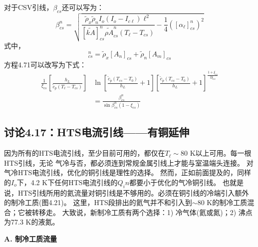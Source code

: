 对于CSV引线，$\beta_{cs}$还可以写为：
\begin{equation}%
\beta_{cs}^{n}=\sqrt{\frac{\tilde{\rho}_x\tilde{\rho}_nI_o(I_o-I_{c\ell})\ell^2}{[\tilde{kA}]_{cs}^{n}\tilde{\rho A}_{cs}^{n}(T_\ell-T_{cs})}-\frac{1}{4}([\alpha_\ell]_{cs}^{n})^2}
\end{equation}
式中，
\begin{equation}%
[\tilde{\rho A}]_{cs}^{n}=\tilde{\rho}_x[A_n]_{cs}+\tilde{\rho}_n[A_m]_{cs}
\end{equation}
方程4.71可以改写为下式：
\begin{align}%
\frac{1}{\xi_{cs}}\left[\frac{h_L}{\tilde{c}_p(T_\ell-T_{cs})}\right]&\ln\left[\frac{\tilde{c}_p(T_{cs}-T_0)}{h_L}+1\right]\left[\frac{\tilde{c}_p(T_{cs}-T_0)}{h_L}+1\right]^{\frac{1+\xi_{cs}}{2\xi_{cs}}}\\
&=\frac{\beta_{cs}^{n}}{\sin\beta_{cs}^{n}(1-\xi_{cs})}
\end{align}



\subsection{讨论4.17：HTS电流引线——有铜延伸}
因为所有的HTS电流引线，至少目前可用的，都仅在$T_\ell\sim$80 K以上可用。每一根HTS引线，无论
气冷与否，都必须连到常规金属引线上才能与室温端头连接。
对气冷HTS电流引线，优化的铜引线是理性的选择。
然而，正如前面提及的，同样的$I_o$下，4.2 K下任何HTS电流引线的$Q_in$都要小于优化的气冷铜引线。 
也就是说，HTS引线所用的氦流量对铜引线是不够用的。必须在铜引线的冷端引入额外的制冷工质(图4.21)。
这里，HTS段排出的氦气并不和引入到$\sim$80 K的制冷工质混合；它被转移走。 
大致说，新制冷工质有两个选择：1) 冷气体(氦或氮)；2) 沸点为77.3 K的液氮。

\textbf{A. 制冷工质流量}

